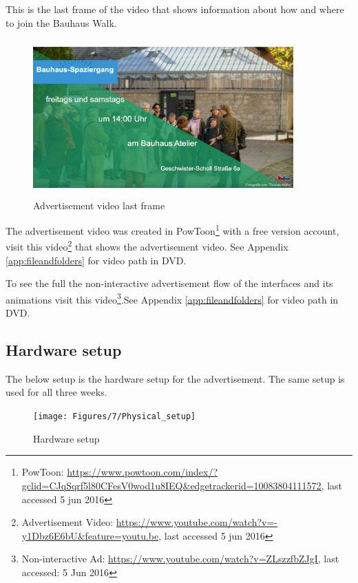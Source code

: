 \begin{enumerate}
This is the last frame of the video that shows information about how and where to join the Bauhaus Walk.

\begin{figure}[H]
    \centering
    \includegraphics[width=100mm,height=60mm]{Figures/7/ad_last}
    \caption{Advertisement video last frame}%
    \label{fig:adthirdpage2}%
\end{figure}

The advertisement video was created in PowToon\footnote{PowToon: \url{https://www.powtoon.com/index/?gclid=CJqSqrf5l80CFesV0wod1u8IEQ&edgetrackerid=10083804111572}, last accessed 5 jun 2016} with a free version account, visit this video\footnote{Advertisement Video:  \url{https://www.youtube.com/watch?v=-y1Dbz6E6bU&feature=youtu.be}, last accessed 5 jun 2016} that shows the advertisement video. See Appendix \ref{app:fileandfolders} for video path in DVD.

To see the full the non-interactive advertisement flow of the interfaces and its animations visit this video\footnote{Non-interactive Ad: \url{https://www.youtube.com/watch?v=ZLszzfbZJgI}, last accessed: 5 Jun 2016}.See Appendix \ref{app:fileandfolders} for video path in DVD.


\end{enumerate}

\iffalse
\subsection{Hardware setup}
The below setup is the hardware setup for the advertisement. The same setup is used for all three weeks.

\begin{figure}[H]
    \centering
    \texttt{[image: Figures/7/Physical\_setup]}
    \caption{Hardware setup}%
    \label{fig:hardwaresetup}%
\end{figure}



